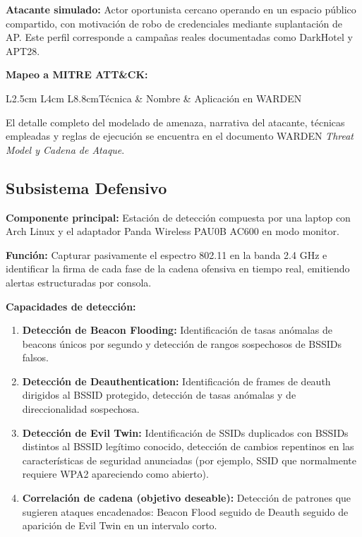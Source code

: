 \documentclass[11pt,a4paper]{article}
\begin{document}
\textbf{Atacante simulado:} Actor oportunista cercano operando en un espacio
público compartido, con motivación de robo de credenciales mediante
suplantación de AP. Este perfil corresponde a campañas reales documentadas
como DarkHotel y APT28.

\textbf{Mapeo a MITRE ATT\&CK:}

\begin{datatable}{L{2.5cm} L{4cm} L{8.8cm}}{Técnica & Nombre & Aplicación en WARDEN}
\end{datatable}

El detalle completo del modelado de amenaza, narrativa del atacante, técnicas
empleadas y reglas de ejecución se encuentra en el documento WARDEN
\emph{Threat Model y Cadena de Ataque}.

\subsection{Subsistema Defensivo}

\textbf{Componente principal:} Estación de detección compuesta por una laptop
con Arch Linux y el adaptador Panda Wireless PAU0B AC600 en modo monitor.

\textbf{Función:} Capturar pasivamente el espectro 802.11 en la banda 2.4 GHz
e identificar la firma de cada fase de la cadena ofensiva en tiempo real,
emitiendo alertas estructuradas por consola.

\textbf{Capacidades de detección:}

\begin{enumerate}
  \item \textbf{Detección de Beacon Flooding:} Identificación de tasas
    anómalas de beacons únicos por segundo y detección de rangos sospechosos
    de BSSIDs falsos.
  \item \textbf{Detección de Deauthentication:} Identificación de frames de
    deauth dirigidos al BSSID protegido, detección de tasas anómalas y de
    direccionalidad sospechosa.
  \item \textbf{Detección de Evil Twin:} Identificación de SSIDs duplicados
    con BSSIDs distintos al BSSID legítimo conocido, detección de cambios
    repentinos en las características de seguridad anunciadas (por ejemplo,
    SSID que normalmente requiere WPA2 apareciendo como abierto).
  \item \textbf{Correlación de cadena (objetivo deseable):} Detección de
    patrones que sugieren ataques encadenados: Beacon Flood seguido de Deauth
    seguido de aparición de Evil Twin en un intervalo corto.
\end{enumerate}
\end{document}
